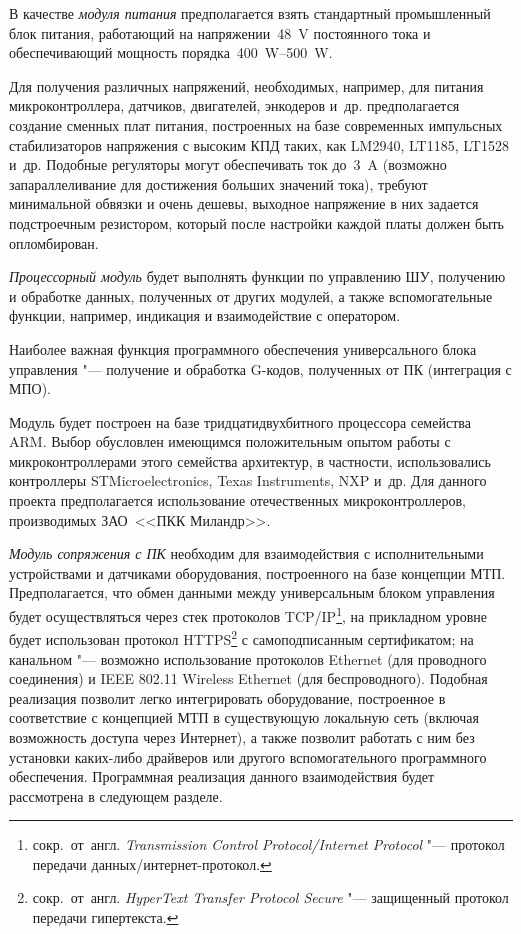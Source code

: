 В качестве \textit{модуля питания} предполагается взять стандартный промышленный блок питания, работающий на напряжении~\SI{48}{\volt} постоянного тока и обеспечивающий мощность порядка~\SIrange{400}{500}{\watt}.

Для получения различных напряжений, необходимых, например, для питания микроконтроллера, датчиков, двигателей, энкодеров и~др. предполагается создание сменных плат питания, построенных на базе современных импульсных стабилизаторов напряжения с высоким КПД таких, как \foreignlanguage{english}{LM}2940, \foreignlanguage{english}{LT}1185, \foreignlanguage{english}{LT}1528 и~др. Подобные регуляторы могут обеспечивать ток до~\SI{3}{\ampere} (возможно запараллеливание для достижения больших значений тока), требуют минимальной обвязки и очень дешевы, выходное напряжение в них задается подстроечным резистором, который после настройки каждой платы должен быть опломбирован.

\textit{Процессорный модуль} будет выполнять функции по управлению ШУ, получению и обработке данных, полученных от других модулей, а также вспомогательные функции, например, индикация и взаимодействие с оператором.

Наиболее важная функция программного обеспечения универсального блока управления "--- получение и обработка \foreignlanguage{english}{G}-кодов, полученных от ПК (интеграция с \foreignlanguage{english}{МПО}).

Модуль будет построен на базе тридцатидвухбитного процессора семейства \foreignlanguage{english}{ARM}. Выбор обусловлен имеющимся положительным опытом работы с микроконтроллерами этого семейства архитектур, в частности, использовались контроллеры \foreignlanguage{english}{STMicroelectronics}, \foreignlanguage{english}{Texas Instruments}, \foreignlanguage{english}{NXP} и~др. Для данного проекта предполагается использование отечественных микроконтроллеров, производимых ЗАО~<<ПКК Миландр>>.

\textit{Модуль сопряжения с ПК} необходим для взаимодействия с исполнительными устройствами и датчиками оборудования, построенного на базе концепции \foreignlanguage{english}{МТП}. Предполагается, что обмен данными между универсальным блоком управления будет осуществляться через стек протоколов \foreignlanguage{english}{TCP/IP}\footnote{сокр.~от~англ. \textit{Transmission Control Protocol/Internet Protocol} "--- протокол передачи данных/интернет-протокол.}, на прикладном уровне будет использован протокол \foreignlanguage{english}{HTTPS}\footnote{сокр.~от~англ. \textit{HyperText Transfer Protocol Secure} "--- защищенный протокол передачи гипертекста.} с самоподписанным сертификатом; на канальном "--- возможно использование протоколов \foreignlanguage{english}{Ethernet} (для проводного соединения) и IEEE 802.11 Wireless Ethernet (для беспроводного). Подобная реализация позволит легко интегрировать оборудование, построенное в соответствие с концепцией \foreignlanguage{english}{МТП} в существующую локальную сеть (включая возможность доступа через Интернет), а также позволит работать с ним без установки каких-либо драйверов или другого вспомогательного программного обеспечения. Программная реализация данного взаимодействия будет рассмотрена в следующем разделе.

